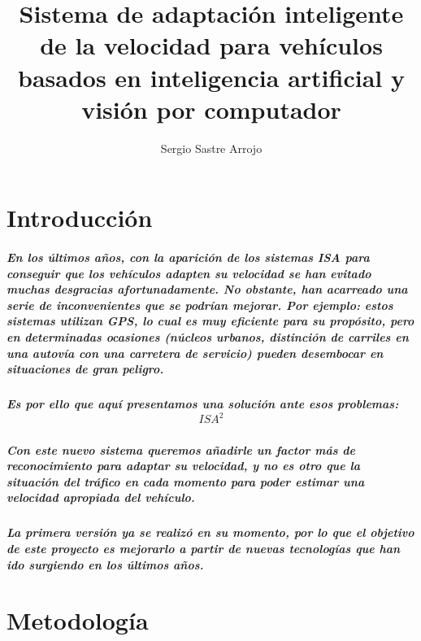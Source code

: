 \documentclass[12pt,a4paper]{report}
\begin{document}
\title{Sistema de adaptación inteligente de la velocidad para vehículos basados en inteligencia artificial y visión por computador}
\author{Sergio Sastre Arrojo}
\maketitle
\chapter*{Introducción}
\paragraph{En los últimos años, con la aparición de los sistemas ISA para conseguir que los vehículos adapten su velocidad se han evitado muchas desgracias afortunadamente. No obstante, han acarreado una serie de inconvenientes que se podrían mejorar. Por ejemplo: estos sistemas utilizan GPS, lo cual es muy eficiente para su propósito, pero en determinadas ocasiones (núcleos urbanos, distinción de carriles en una autovía con una carretera de servicio) pueden desembocar en situaciones de gran peligro.}
\paragraph{Es por ello que aquí presentamos una solución ante esos problemas: \[ISA^{2}\]}
\paragraph{Con este nuevo sistema queremos añadirle un factor más de reconocimiento para adaptar su velocidad, y no es otro que la situación del tráfico en cada momento para poder estimar una velocidad apropiada del vehículo.}
\paragraph{La primera versión ya se realizó en su momento, por lo que el objetivo de este proyecto es mejorarlo a partir de nuevas tecnologías que han ido surgiendo en los últimos años.}
\chapter*{Metodología}
\end{document}
